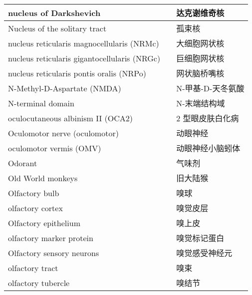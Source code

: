 \begin{longtable}{lll}
	\midrule
	nucleus of Darkshevich   && 达克谢维奇核  \\
	
	\midrule
	Nucleus of the solitary tract   && 孤束核  \\
	
	\midrule
	nucleus reticularis magnocellularis (NRMc)   && 大细胞网状核  \\
	
	\midrule
	nucleus reticularis gigantocellularis (NRGc)   && 巨细胞网状核  \\
	
	\midrule
	nucleus reticularis pontis oralis (NRPo)   && 网状脑桥嘴核  \\
	
	\midrule
	N-Methyl-D-Aspartate (NMDA)   && N-甲基-D-天冬氨酸  \\
	
	\midrule
	N-terminal domain   && N-末端结构域  \\
	
	\midrule
	oculocutaneous albinism II (OCA2)     && 2 型眼皮肤白化病   \\
	
	\midrule
	Oculomotor nerve (oculomotor)     && 动眼神经   \\
	
	\midrule
	oculomotor vermis (OMV)     && 动眼神经小脑蚓体   \\
	
	\midrule
	Odorant     && 气味剂   \\
	
	\midrule
	Old World monkeys     && 旧大陆猴   \\
	
	\midrule
	Olfactory bulb     && 嗅球   \\
	
	\midrule
	olfactory cortex     && 嗅觉皮层   \\
	
	\midrule
	Olfactory epithelium     && 嗅上皮   \\
	
	\midrule
	olfactory marker protein     && 嗅觉标记蛋白   \\
	
	\midrule
	Olfactory sensory neurons     && 嗅觉感受神经元   \\
	
	\midrule
	olfactory tract     && 嗅束   \\
	
	\midrule
	olfactory tubercle     && 嗅结节   \\
	

\end{longtable}
